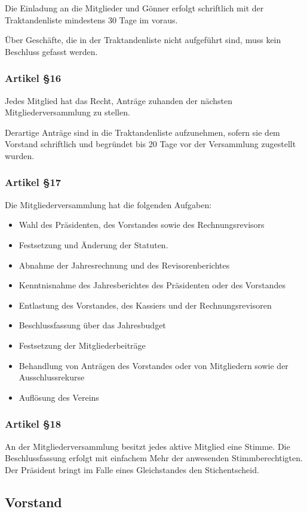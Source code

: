 \documentclass[a4paper,
               10pt,
               fleqn]{article}
\begin{document}
Die Einladung an die Mitglieder und Gönner erfolgt 
schriftlich mit der Traktandenliste mindestens 30 Tage im
voraus.

Über Geschäfte, die in der Traktandenliste nicht aufgeführt 
sind, muss kein Beschluss gefasst werden.

\subsubsection*{Artikel §16}
Jedes Mitglied hat das Recht, Anträge zuhanden der nächsten 
Mitgliederversammlung zu stellen.

Derartige Anträge sind in die Traktandenliste aufzunehmen, 
sofern sie dem Vorstand schriftlich und begründet bis 20
Tage vor der Versammlung zugestellt wurden.

\newpage
\subsubsection*{Artikel §17}
Die Mitgliederversammlung hat die folgenden Aufgaben:
\begin{itemize}
\item Wahl des Präsidenten, des Vorstandes sowie des 
Rechnungsrevisors
\item Festsetzung und Änderung der Statuten.
\item Abnahme der Jahresrechnung und des Revisorenberichtes
\item Kenntnisnahme des Jahresberichtes des Präsidenten 
oder des Vorstandes
\item Entlastung des Vorstandes, des Kassiers und der 
Rechnungsrevisoren
\item Beschlussfassung über das Jahresbudget
\item Festsetzung der Mitgliederbeiträge
\item Behandlung von Anträgen des Vorstandes oder von 
Mitgliedern sowie der Ausschlussrekurse
\item Auflösung des Vereins
\end{itemize}

\subsubsection*{Artikel §18}
An der Mitgliederversammlung besitzt jedes aktive Mitglied 
eine Stimme. Die Beschlussfassung erfolgt mit einfachem Mehr
der anwesenden Stimmberechtigten. 
Der Präsident bringt im Falle eines Gleichstandes den 
Stichentscheid.

\subsection{Vorstand}
\end{document}
